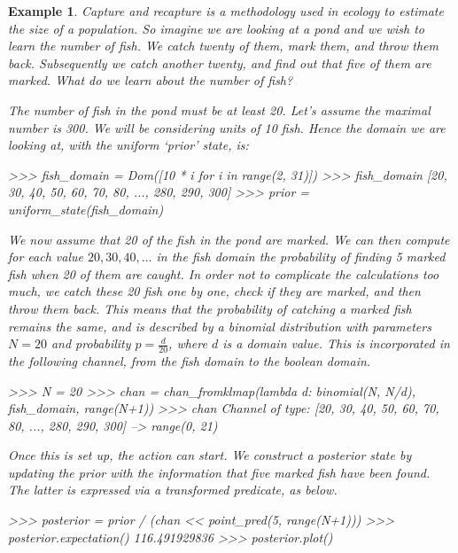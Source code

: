 \documentclass[leqno]{tufte-book} %
\newtheorem{example}[theorem]{Example}
\begin{document}
\begin{example}
\label{ex:capture}
Capture and recapture is a methodology used
in ecology to estimate the size of a population. So imagine we are
looking at a pond and we wish to learn the number of fish. We catch
twenty of them, mark them, and throw them back. Subsequently we catch
another twenty, and find out that five of them are marked. What do we
learn about the number of fish?

The number of fish in the pond must be at least 20. Let's assume the
maximal number is 300. We will be considering units of 10 fish. Hence
the domain we are looking at, with the uniform `prior' state, is:
\begin{python}
>>> fish_domain = Dom([10 * i for i in range(2, 31)])
>>> fish_domain
[20, 30, 40, 50, 60, 70, 80, ..., 280, 290, 300]
>>> prior = uniform_state(fish_domain)
\end{python}

\noindent We now assume that 20 of the fish in the pond are marked. We
can then compute for each value $20, 30, 40, \ldots$ in the fish
domain the probability of finding 5 marked fish when 20 of them are
caught. In order not to complicate the calculations too much, we catch
these 20 fish one by one, check if they are marked, and then throw
them back. This means that the probability of catching a marked fish
remains the same, and is described by a binomial distribution with
parameters $N=20$ and probability $p = \frac{d}{20}$, where $d$ is a
domain value. This is incorporated in the following channel, from the
fish domain to the boolean domain.
\begin{python}
>>> N = 20
>>> chan = chan_fromklmap(lambda d: binomial(N, N/d), fish_domain, range(N+1))
>>> chan
Channel of type: [20, 30, 40, 50, 60, 70, 80, ..., 280, 290, 300] --> range(0, 21)
\end{python}

\noindent Once this is set up, the action can start. We construct
a posterior state by updating the prior with the information that
five marked fish have been found. The latter is expressed via
a transformed predicate, as below.
\begin{python}
>>> posterior = prior / (chan << point_pred(5, range(N+1)))
>>> posterior.expectation()
116.491929836
>>> posterior.plot()
\end{python}


\end{example}
\end{document}
